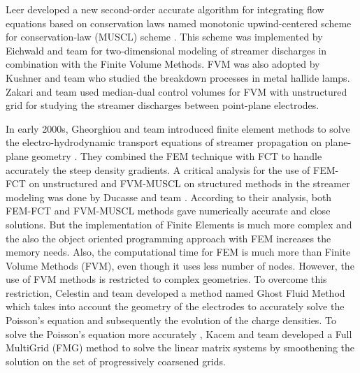 \documentclass{article}
\begin{document}
Leer developed a new second-order accurate algorithm for integrating flow equations based on conservation laws named monotonic upwind-centered scheme for conservation-law (MUSCL) scheme \cite{vanLeer1979TowardsMethod}. This scheme was implemented by Eichwald and team \cite{Eichwald1998} \cite{Eichwald2006EffectDynamics} for two-dimensional modeling of streamer discharges in combination with the Finite Volume Methods. FVM was also adopted by Kushner and team \cite{Lay2003BreakdownLamps} who studied the breakdown processes in metal hallide lamps. Zakari and team \cite{Zakari2015AnDischarge} used median-dual control volumes for FVM with unstructured grid for studying the streamer discharges between point-plane electrodes.

In early 2000s, Gheorghiou and team introduced finite element methods to solve the electro-hydrodynamic transport equations of streamer propagation on plane-plane geometry \cite{Georghiou1999AnAlgorithm}. They combined the FEM technique with FCT to handle accurately the steep density gradients. A critical analysis for the use of FEM-FCT on unstructured and FVM-MUSCL on structured methods in the streamer modeling was done by Ducasse and team \cite{Ducasse2007CriticalMethods}. According to their analysis, both FEM-FCT and FVM-MUSCL methods gave numerically accurate and close solutions. But the implementation of Finite Elements is much more complex and the also the object oriented programming approach with FEM increases the memory needs. Also, the computational time for FEM is much more than Finite Volume Methods (FVM), even though it uses less number of nodes. However, the use of FVM methods is restricted to complex geometries. To overcome this restriction, Celestin and team \cite{Celestin2009TheGeometries} developed a method named Ghost Fluid Method which takes into account the geometry of the electrodes to accurately solve the Poisson's equation and subsequently the evolution of the charge densities. To solve the Poisson's equation more accurately , Kacem and team \cite{Kacem2012FullPressure} developed a Full MultiGrid (FMG) method to solve the linear matrix systems by smoothening the solution on the set of progressively coarsened grids.
\end{document}
